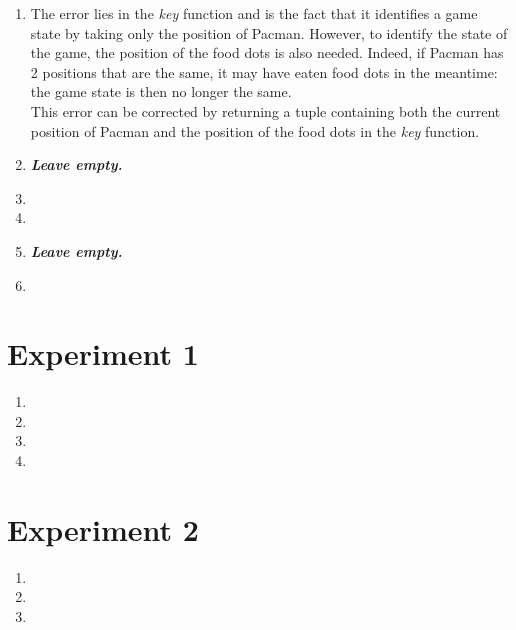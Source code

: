\documentclass{article}
\begin{document}
\begin{enumerate}[label=\alph*.,leftmargin=1.35em]
    \item The error lies in the \textit{key} function and is the fact that it identifies a game state by taking only the position of Pacman. However, to identify the state of the game, the position of the food dots is also needed. Indeed, if Pacman has 2 positions that are the same, it may have eaten food dots in the meantime: the game state is then no longer the same.\\
          This error can be corrected by returning a tuple containing both the current position of Pacman and the position of the food dots in the \textit{key} function.  
    \item \textbf{{\it Leave empty.}}
    \item
    \item
    \item \textbf{{\it Leave empty.}}
    \item
\end{enumerate}

\section{Experiment 1}

\begin{enumerate}[label=\alph*.,leftmargin=1.35em]
    \item
    \item
    \item
    \item
\end{enumerate}

\section{Experiment 2}

\begin{enumerate}[label=\alph*.,leftmargin=1.35em]
    \item
    \item
    \item
\end{enumerate}


\end{document}
